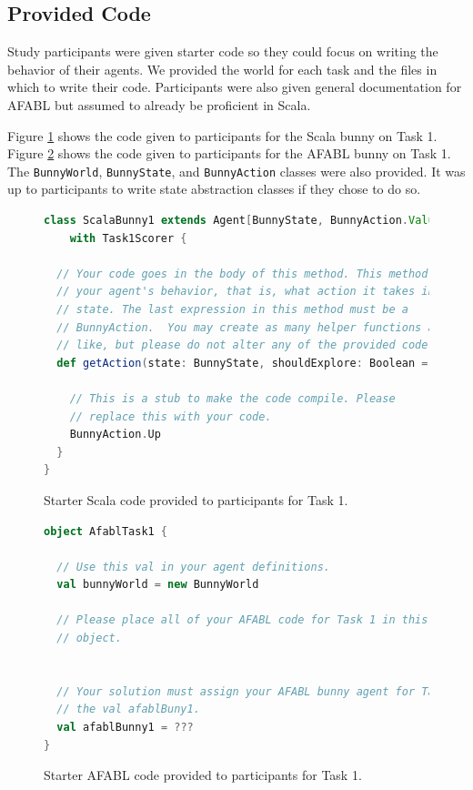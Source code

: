 
\subsection{Provided Code}

Study participants were given starter code so they could focus on writing the behavior of their agents. We provided the world for each task and the files in which to write their code. Participants were also given general documentation for AFABL but assumed to already be proficient in Scala.

Figure \ref{fig:scala-task1-provided} shows the code given to participants for the Scala bunny on Task 1. Figure \ref{fig:afabl-task1-provided} shows the code given to participants for the AFABL bunny on Task 1. The {\tt BunnyWorld}, {\tt BunnyState}, and {\tt BunnyAction} classes were also provided. It was up to participants to write state abstraction classes if they chose to do so.


\begin{figure}[!h]
\begin{center}

\begin{lstlisting}[language=Scala]
class ScalaBunny1 extends Agent[BunnyState, BunnyAction.Value]
    with Task1Scorer {

  // Your code goes in the body of this method. This method defines
  // your agent's behavior, that is, what action it takes in a given
  // state. The last expression in this method must be a
  // BunnyAction.  You may create as many helper functions as you
  // like, but please do not alter any of the provided code.
  def getAction(state: BunnyState, shouldExplore: Boolean = false) = {

    // This is a stub to make the code compile. Please
    // replace this with your code.
    BunnyAction.Up
  }
}
\end{lstlisting}

\caption{Starter Scala code provided to participants for Task 1.}
\end{center}
\label{fig:scala-task1-provided}
\end{figure}


\begin{figure}[!h]
\begin{center}

\begin{lstlisting}[language=Scala]
object AfablTask1 {

  // Use this val in your agent definitions.
  val bunnyWorld = new BunnyWorld

  // Please place all of your AFABL code for Task 1 in this singleton
  // object.


  // Your solution must assign your AFABL bunny agent for Task 1 to
  // the val afablBuny1.
  val afablBunny1 = ???
}
\end{lstlisting}

\caption{Starter AFABL code provided to participants for Task 1.}
\end{center}
\label{fig:afabl-task1-provided}
\end{figure}


